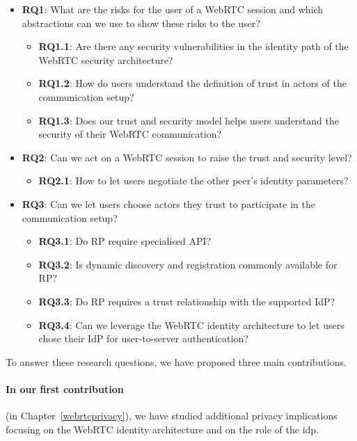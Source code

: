 \begin{itemize}
\item \textbf{RQ1}: What are the risks for the user of a WebRTC session and which abstractions can we use to show these risks to the user?
\begin{itemize}
    \item \textbf{RQ1.1}: Are there any security vulnerabilities in the identity path of the WebRTC security architecture?
    \item \textbf{RQ1.2}: How do users understand the definition of trust in actors of the communication setup?
    \item \textbf{RQ1.3}: Does our trust and security model helps users understand the security of their WebRTC communication?
\end{itemize}
\item \textbf{RQ2}: Can we act on a WebRTC session to raise the trust and security level? 
\begin{itemize}
    \item \textbf{RQ2.1}: How to let users negotiate the other peer's identity parameters?
\end{itemize}
\item \textbf{RQ3}: Can we let users choose actors they trust to participate in the communication setup?
\begin{itemize}
    \item \textbf{RQ3.1}: Do RP require specialised API?
    \item \textbf{RQ3.2}: Is dynamic discovery and registration commonly available for RP?
    \item \textbf{RQ3.3}: Do RP requires a trust relationship with the supported IdP?
    \item \textbf{RQ3.4}: Can we leverage the WebRTC identity architecture to let users chose their IdP for user-to-server authentication?
\end{itemize}
\end{itemize}

To answer these research questions, we have proposed three main contributions.

\paragraph{In our first contribution} (in Chapter~\ref{webrtcprivacy}), we have studied additional privacy implications focusing on the WebRTC identity architecture and on the role of the \gls{idp}.

